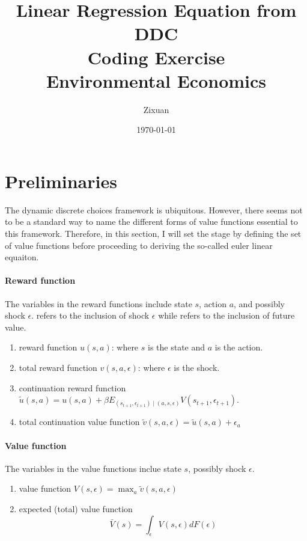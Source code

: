 \documentclass[12pt]{article}[margin=1in]
\title{\textbf{Linear Regression Equation from DDC} \\
\vspace{.3cm}
\large Coding Exercise \\
Environmental Economics}
\author{Zixuan}
\date{\today}
\begin{document}
\maketitle

\setcounter{page}{1}
\section{Preliminaries}
The dynamic discrete choices framework is ubiquitous. However, there seems not to be a standard way to name the different forms of value functions essential to this framework. Therefore, in this section, I will set the stage by defining the set of value functions before proceeding to deriving the so-called euler linear equaiton. 

\paragraph{Reward function}
The variables in the reward functions include state $s$, action $a$, and possibly shock $\epsilon$. 
 refers to the inclusion of shock $\epsilon$ while  refers to the inclusion of future value.
\begin{enumerate}
    \item reward function $u(s, a)$: where $s$ is the state and $a$ is the action.
    \item total reward function $v(s, a, \epsilon)$: where $\epsilon$ is the shock.
    \item continuation reward function $\tilde{u}(s, a) = u(s, a) +  \beta E_{(s_{t+1},\epsilon_{t+1})\mid (a, s, \epsilon)} V(s_{t+1},\epsilon_{t+1})$.
    \item total continuation value function $\tilde{v}(s, a , \epsilon)  = \tilde{u}(s, a) + \epsilon_a$
\end{enumerate}

\paragraph{Value function}
The variables in the value functions inclue state $s$, possibly shock $\epsilon$. 
\begin{enumerate}
    \item value function $V(s, \epsilon) = \max_{a} \tilde{v}(s, a , \epsilon)$
    \item expected (total) value function $$\bar{V}(s) = \int_{\epsilon} V(s, \epsilon) dF(\epsilon)$$
\end{enumerate}
\end{document}
